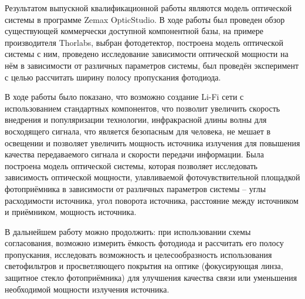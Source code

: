 \Conclusion

Результатом выпускной квалификационной работы являются модель оптической системы в программе Zemax OpticStudio. В ходе работы был проведен обзор существующей коммерчески доступной компонентной базы, на примере производителя Thorlabs, выбран фотодетектор, построена модель оптической системы с ним, проведено исследование зависимости оптической мощности на нём в зависимости от различных параметров системы, был проведён эксперимент с целью рассчитать ширину полосу пропускания фотодиода. 

В ходе работы было показано, что возможно создание Li-Fi сети с использованием стандартных компонентов, что позволит увеличить скорость внедрения и популяризации технологии, инфракрасной длины волны для восходящего сигнала, что является безопасным для человека, не мешает в освещении и позволяет увеличить мощность источника излучения для повышения качества передаваемого сигнала и скорости передачи информации. Была построена модель оптической системы, которая позволяет исследовать зависимость оптической мощности, улавливаемой фоточувствительной площадкой фотоприёмника в зависимости от различных параметров системы \--- углы расходимости источника, угол поворота источника, расстояние между источником и приёмником, мощность источника.

В дальнейшем работу можно продолжить: при использовании схемы согласования, возможно измерить ёмкость фотодиода и рассчитать его полосу пропускания, исследовать возможность и целесообразность использования светофильтров и просветляющего покрытия на оптике (фокусирующая линза, защитное стекло фотоприёмника) для улучшения качества связи или уменьшения необходимой мощности излучения источника.